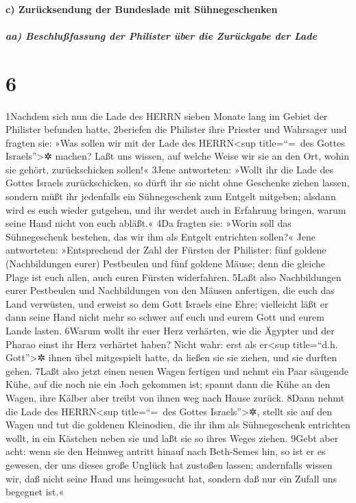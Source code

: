 \hypertarget{c-zuruxfccksendung-der-bundeslade-mit-suxfchnegeschenken}{%
\paragraph{c) Zurücksendung der Bundeslade mit
Sühnegeschenken}\label{c-zuruxfccksendung-der-bundeslade-mit-suxfchnegeschenken}}

\hypertarget{aa-beschluuxdffassung-der-philister-uxfcber-die-zuruxfcckgabe-der-lade}{%
\subparagraph{aa) Beschlußfassung der Philister über die Zurückgabe der
Lade}\label{aa-beschluuxdffassung-der-philister-uxfcber-die-zuruxfcckgabe-der-lade}}

\hypertarget{section-5}{%
\section{6}\label{section-5}}

1Nachdem sich nun die Lade des HERRN sieben Monate lang im Gebiet der
Philister befunden hatte, 2beriefen die Philister ihre Priester und
Wahrsager und fragten sie: »Was sollen wir mit der Lade des
HERRN\textless sup title=``=~des Gottes Israels''\textgreater✲ machen?
Laßt uns wissen, auf welche Weise wir sie an den Ort, wohin sie gehört,
zurückschicken sollen!« 3Jene antworteten: »Wollt ihr die Lade des
Gottes Israels zurückschicken, so dürft ihr sie nicht ohne Geschenke
ziehen lassen, sondern müßt ihr jedenfalls ein Sühnegeschenk zum Entgelt
mitgeben; alsdann wird es euch wieder gutgehen, und ihr werdet auch in
Erfahrung bringen, warum seine Hand nicht von euch abläßt.« 4Da fragten
sie: »Worin soll das Sühnegeschenk bestehen, das wir ihm als Entgelt
entrichten sollen?« Jene antworteten: »Entsprechend der Zahl der Fürsten
der Philister: fünf goldene (Nachbildungen eurer) Pestbeulen und fünf
goldene Mäuse; denn die gleiche Plage ist euch allen, auch euren Fürsten
widerfahren. 5Laßt also Nachbildungen eurer Pestbeulen und Nachbildungen
von den Mäusen anfertigen, die euch das Land verwüsten, und erweist so
dem Gott Israels eine Ehre; vielleicht läßt er dann seine Hand nicht
mehr so schwer auf euch und eurem Gott und eurem Lande lasten. 6Warum
wollt ihr euer Herz verhärten, wie die Ägypter und der Pharao einst ihr
Herz verhärtet haben? Nicht wahr: erst als er\textless sup title=``d.h.
Gott''\textgreater✲ ihnen übel mitgespielt hatte, da ließen sie sie
ziehen, und sie durften gehen. 7Laßt also jetzt einen neuen Wagen
fertigen und nehmt ein Paar säugende Kühe, auf die noch nie ein Joch
gekommen ist; spannt dann die Kühe an den Wagen, ihre Kälber aber treibt
von ihnen weg nach Hause zurück. 8Dann nehmt die Lade des
HERRN\textless sup title=``=~des Gottes Israels''\textgreater✲, stellt
sie auf den Wagen und tut die goldenen Kleinodien, die ihr ihm als
Sühnegeschenk entrichten wollt, in ein Kästchen neben sie und laßt sie
so ihres Weges ziehen. 9Gebt aber acht: wenn sie den Heimweg antritt
hinauf nach Beth-Semes hin, so ist er es gewesen, der uns dieses große
Unglück hat zustoßen lassen; andernfalls wissen wir, daß nicht seine
Hand uns heimgesucht hat, sondern daß nur ein Zufall uns begegnet ist.«

